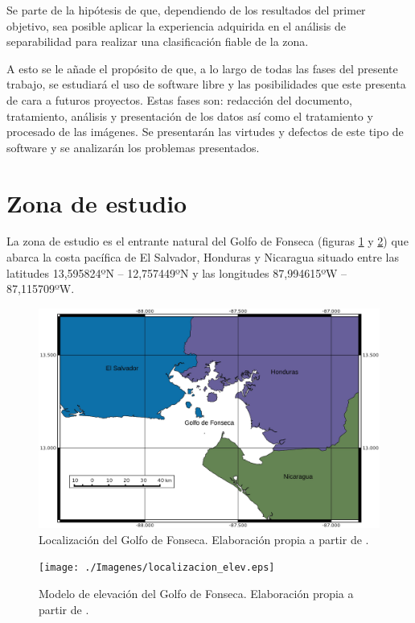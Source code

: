 Se parte de la hipótesis de que, dependiendo de los resultados del primer objetivo, sea posible aplicar la experiencia adquirida en el análisis de separabilidad para realizar una clasificación fiable de la zona.%

A esto se le añade el propósito de que, a lo largo de todas las fases del presente trabajo, se estudiará el uso de software libre y las posibilidades que este presenta de cara a futuros proyectos. Estas fases son: redacción del documento, tratamiento, análisis y presentación de los datos así como el tratamiento y procesado de las imágenes. Se presentarán las virtudes y defectos de este tipo de software y se analizarán los problemas presentados.%

\section{Zona de estudio}\label{sec:zonaestudio}
La zona de estudio es el entrante natural del Golfo de Fonseca (figuras \ref{fig:localizacion} y \ref{fig:elevacion}) que abarca la costa pacífica de El Salvador, Honduras y Nicaragua situado entre las latitudes 13,595824ºN – 12,757449ºN y las longitudes 87,994615ºW – 87,115709ºW.%

\begin{figure}
	\centering
	\includegraphics[width=0.8\linewidth]{./Imagenes/localizacion.eps}
	\caption[Localización del Golfo de Fonseca]{Localización del Golfo de Fonseca. Elaboración propia a partir de \cite{GADM2012}.}
	\label{fig:localizacion}
\end{figure}

\begin{figure}
	\centering
	\texttt{[image: ./Imagenes/localizacion\_elev.eps]}
	\caption[Modelo de elevación del Golfo de Fonseca]{Modelo de elevación del Golfo de Fonseca. Elaboración propia a partir de \cite{SRTM2008}.}
	\label{fig:elevacion}
\end{figure}

